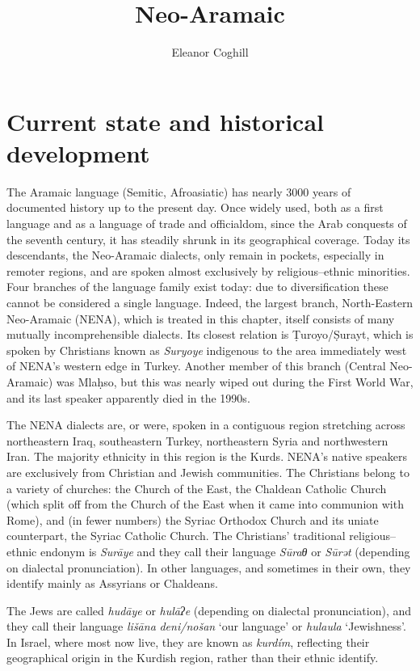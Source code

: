 \documentclass[output=paper]{langsci/langscibook}
\author{Eleanor Coghill\affiliation{Uppsala University}}
\title{Neo-Aramaic}
\begin{document}
\section{Current state and historical development}

The Aramaic language (Semitic, Afroasiatic) has nearly 3000 years of documented history up to the present day. Once widely used, both as a first language and as a language of trade and officialdom, since the Arab conquests of the seventh century, it has steadily shrunk in its geographical coverage. Today its descendants, the Neo-Aramaic dialects, only remain in pockets, especially in remoter regions, and are spoken almost exclusively by religious–ethnic minorities. Four branches of the language family exist today: due to diversification these cannot be considered a single language. Indeed, the largest branch, North-Eastern Neo-Aramaic (NENA), which is treated in this chapter, itself consists of many mutually incomprehensible dialects. Its closest relation is Ṭuroyo/Ṣurayt, which is spoken by Christians known as \textit{Suryoye} indigenous to the area immediately west of NENA’s western edge in Turkey. Another member of this branch (Central Neo-Aramaic) was Mlaḥso, but this was nearly wiped out during the First World War, and its last speaker apparently died in the 1990s. 

The NENA dialects are, or were, spoken in a contiguous region stretching across northeastern Iraq, southeastern Turkey, northeastern Syria and northwestern Iran. The majority ethnicity in this region is the Kurds. NENA’s native speakers are exclusively from Christian and Jewish communities. The Christians belong to a variety of churches: the Church of the East, the Chaldean Catholic Church (which split off from the Church of the East when it came into communion with Rome), and (in fewer numbers) the Syriac Orthodox Church and its uniate counterpart, the Syriac Catholic Church. The Christians’ traditional religious–ethnic endonym is \textit{Surāye} and they call their language \textit{Sūraθ} or \textit{Sūrət} (depending on dialectal pronunciation). In other languages, and sometimes in their own, they identify mainly as Assyrians or Chaldeans.

The Jews are called \textit{hudāye} or \textit{hulāʔe} (depending on dialectal pronunciation), and they call their language \textit{lišāna} \textit{deni/nošan} ‘our language’ or \textit{hulaula} ‘Jewishness’. In Israel, where most now live, they are known as \textit{kurdím}, reflecting their geographical origin in the Kurdish region, rather than their ethnic identify.
\end{document}

